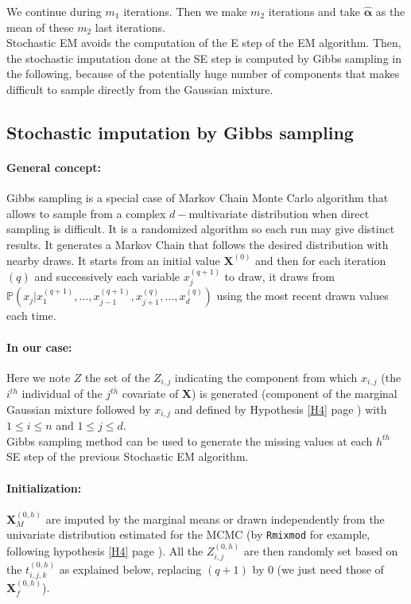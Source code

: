 \documentclass[12pt,a4paper]{report}
\begin{document}
		We continue during $m_1$ iterations. Then we make $m_2$ iterations and take $\hat{\boldsymbol{\alpha}}$ as the mean of these $m_2$ last iterations.\\
		
	Stochastic EM avoids the computation of the E step of the EM algorithm.
	Then, the stochastic imputation done at the SE step is computed by Gibbs sampling in the following, because of the potentially huge number of components that makes difficult to sample directly from the Gaussian mixture.

	\subsection{Stochastic imputation by Gibbs sampling}\label{gibbsmiss}
	\paragraph{General concept:}	Gibbs sampling \cite{casella1992explaining} is a special case of Markov Chain Monte Carlo algorithm \cite{gilks1996markov,chib1995understanding,roberts2001optimal} that allows to sample from a complex $d-$multivariate distribution when direct sampling is difficult. It is a randomized algorithm so each run may give distinct results. It generates a Markov Chain that follows the desired distribution with nearby draws. It starts from an initial value $\boldsymbol{X}^{(0)}$ and then for each iteration $(q)$ and successively each variable $x_j^{(q+1)}$ to draw, it draws from $\mathbb{P}(x_j|x_1^{(q+1)}, \dots,x_{j-1}^{(q+1)},x_{j+1}^{(q)},\dots,x_d^{(q)})$ using the most recent drawn values each time. \\
\paragraph{In our case:}		
		Here we note $Z$ the set of the $Z_{i,j}$ indicating the component from which $x_{i,j}$ (the $i^{th}$ individual of the $j^{th}$ covariate of $\boldsymbol{X}$) is generated (component of the marginal Gaussian mixture followed by $x_{i,j}$ and defined by Hypothesis \ref{H4} page \pageref{H4}) with $1\leq i\leq n$ and $1\leq j\leq d$. \\
		
		Gibbs sampling method can be used to generate the missing values at each $h^{th}$ SE step of the previous Stochastic EM algorithm. 
		\paragraph{Initialization:}  %
		$\boldsymbol{X}_M^{(0,h)}$ are imputed by the marginal means or drawn independently from the univariate distribution estimated for the MCMC (by {\tt Rmixmod} for example, following hypothesis \ref{H4} page \pageref{H4}). All the $Z_{i,j}^{(0,h)}$ are then randomly set based on the $t_{i,j,k}^{(0,h)}$ as explained below, replacing $(q+1)$ by $0$ (we just need those of $\boldsymbol{X}_f^{(0,h)}$). 
\end{document}
